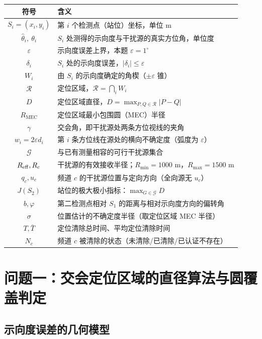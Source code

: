 \documentclass[withoutpreface,bwprint]{cumcmthesis}
\begin{document}
\begin{center}
\begin{longtable}{cl}
\toprule
符号 & 含义\\
\midrule
\endhead
$S_i=(x_i,y_i)$ & 第 $i$ 个检测点（站位）坐标，单位 m\\
$\hat\theta_i,\ \theta_i$ & $S_i$ 处测得的示向度与干扰源的真实方位角，单位度\\
$\varepsilon$ & 示向度误差上界，本题 $\varepsilon=1^{\circ}$\\
$\delta_i$ & $S_i$ 处的示向度误差，$|\delta_i|\le\varepsilon$\\
$W_i$ & 由 $S_i$ 的示向度确定的角楔（$\pm\varepsilon$ 锥）\\
$\mathcal{R}$ & 定位区域，$\mathcal{R}=\bigcap_i W_i$\\
$D$ & 定位区域直径，$D=\max_{P,Q\in\mathcal{R}}|P-Q|$\\
$R_{\mathrm{MEC}}$ & 定位区域最小包围圆（MEC）半径\\
$\gamma$ & 交会角，即干扰源处两条方位视线的夹角\\
$w_i=2\varepsilon d_i$ & 第 $i$ 条方位线在源处的横向不确定度（弧度为 $\varepsilon$）\\
$\mathcal{G}$ & 与已有测量相容的可行干扰源集合\\
$R_{\rm eff},R_c$ & 干扰源的有效接收半径；$R_{\min}=1000$ m，$R_{\max}=1500$ m\\
$q_c,u_c$ & 频道 $c$ 的干扰源位置与定向方向（全向源无 $u_c$）\\
$J(S_2)$ & 站位的极大极小指标：$\max_{G\in\mathcal{G}}D$\\
$b,\varphi$ & 第二检测点相对 $S_1$ 的距离与相对示向度方向的偏转角\\
$\sigma$ & 位置估计的不确定度半径（取定位区域 MEC 半径）\\
$T,\bar T$ & 定位清除总时间、平均定位清除时间\\
$N_c$ & 频道 $c$ 被清除的状态（未清除/已清除/已认证不存在）\\
\bottomrule
\end{longtable}
\end{center}

\section{问题一：交会定位区域的直径算法与圆覆盖判定}

\subsection{示向度误差的几何模型}
\end{document}

